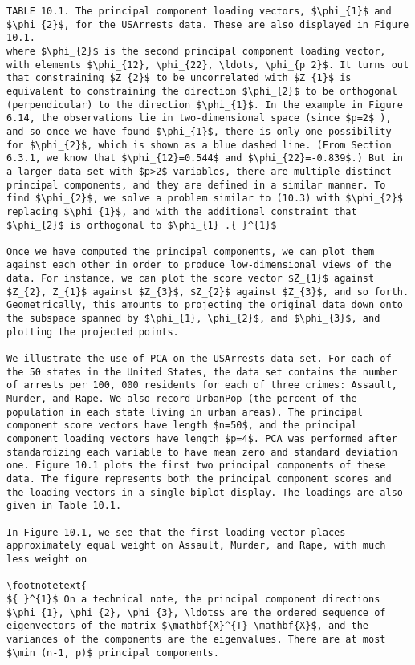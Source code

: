 \documentclass[10pt]{article}
\let\svthefootnote\thefootnote
\newcommand\blfootnotetext[1]{%
  \let\thefootnote\relax\footnote{#1}%
  \addtocounter{footnote}{-1}%
  \let\thefootnote\svthefootnote%
}
\let\svfootnotetext\footnotetext
\renewcommand\footnotetext[2][?]{%
  \if\relax#1\relax%
    \ifnum\value{footnote}=0\blfootnotetext{#2}\else\svfootnotetext{#2}\fi%
  \else%
    \if?#1\ifnum\value{footnote}=0\blfootnotetext{#2}\else\svfootnotetext{#2}\fi%
    \else\svfootnotetext[#1]{#2}\fi%
  \fi
}
\begin{document}
\begin{verbatim}
TABLE 10.1. The principal component loading vectors, $\phi_{1}$ and $\phi_{2}$, for the USArrests data. These are also displayed in Figure 10.1.
where $\phi_{2}$ is the second principal component loading vector, with elements $\phi_{12}, \phi_{22}, \ldots, \phi_{p 2}$. It turns out that constraining $Z_{2}$ to be uncorrelated with $Z_{1}$ is equivalent to constraining the direction $\phi_{2}$ to be orthogonal (perpendicular) to the direction $\phi_{1}$. In the example in Figure 6.14, the observations lie in two-dimensional space (since $p=2$ ), and so once we have found $\phi_{1}$, there is only one possibility for $\phi_{2}$, which is shown as a blue dashed line. (From Section 6.3.1, we know that $\phi_{12}=0.544$ and $\phi_{22}=-0.839$.) But in a larger data set with $p>2$ variables, there are multiple distinct principal components, and they are defined in a similar manner. To find $\phi_{2}$, we solve a problem similar to (10.3) with $\phi_{2}$ replacing $\phi_{1}$, and with the additional constraint that $\phi_{2}$ is orthogonal to $\phi_{1} .{ }^{1}$

Once we have computed the principal components, we can plot them against each other in order to produce low-dimensional views of the data. For instance, we can plot the score vector $Z_{1}$ against $Z_{2}, Z_{1}$ against $Z_{3}$, $Z_{2}$ against $Z_{3}$, and so forth. Geometrically, this amounts to projecting the original data down onto the subspace spanned by $\phi_{1}, \phi_{2}$, and $\phi_{3}$, and plotting the projected points.

We illustrate the use of PCA on the USArrests data set. For each of the 50 states in the United States, the data set contains the number of arrests per 100, 000 residents for each of three crimes: Assault, Murder, and Rape. We also record UrbanPop (the percent of the population in each state living in urban areas). The principal component score vectors have length $n=50$, and the principal component loading vectors have length $p=4$. PCA was performed after standardizing each variable to have mean zero and standard deviation one. Figure 10.1 plots the first two principal components of these data. The figure represents both the principal component scores and the loading vectors in a single biplot display. The loadings are also given in Table 10.1.

In Figure 10.1, we see that the first loading vector places approximately equal weight on Assault, Murder, and Rape, with much less weight on

\footnotetext{
${ }^{1}$ On a technical note, the principal component directions $\phi_{1}, \phi_{2}, \phi_{3}, \ldots$ are the ordered sequence of eigenvectors of the matrix $\mathbf{X}^{T} \mathbf{X}$, and the variances of the components are the eigenvalues. There are at most $\min (n-1, p)$ principal components.


\end{verbatim}
\end{document}
